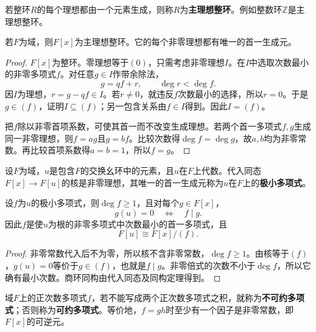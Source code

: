 \begin{definition}
若整环$R$的每个理想都由一个元素生成，则称$R$为\textbf{主理想整环}。例如整数环$\mathbb Z$是主理想整环。
\end{definition}

\begin{theorem}\label{p2:field-poly-pid}
若$F$为域，则$F[x]$为主理想整环。它的每个非零理想都有唯一的首一生成元。
\end{theorem}
\begin{proof}
$F[x]$为整环。零理想等于$(0)$，只需考虑非零理想$I$。在$I$中选取次数最小的非零多项式$f$。对任意$g\in I$作带余除法，
\[
g=qf+r,\qquad\deg r<\deg f.
\]
因$I$为理想，$r=g-qf\in I$。若$r\ne0$，就违反$f$次数最小的选择，所以$r=0$。于是$g\in(f)$，证明$I\subseteq(f)$；另一包含关系由$f\in I$得到。因此$I=(f)$。

把$f$除以非零首项系数，可使其首一而不改变生成理想。若两个首一多项式$f,g$生成同一非零理想，则$f=ag$且$g=bf$。比较次数得$\deg f=\deg g$，故$a,b$均为非零常数。再比较首项系数得$a=b=1$，所以$f=g$。
\end{proof}

\begin{definition}
设$F$为域，$u$是包含$F$的交换幺环中的元素，且$u$在$F$上代数。代入同态$F[x]\to F[u]$的核是非零理想，其唯一的首一生成元称为$u$在$F$上的\textbf{极小多项式}。
\end{definition}

\begin{proposition}
设$f$为$u$的极小多项式，则$\deg f\ge1$，且对每个$g\in F[x]$，
\[
g(u)=0\quad\Longleftrightarrow\quad f\mid g.
\]
因此$f$是使$u$为根的非零多项式中次数最小的首一多项式，且
\[
F[u]\cong F[x]/(f).
\]
\end{proposition}
\begin{proof}
非零常数代入后不为零，所以核不含非零常数，$\deg f\ge1$。由核等于$(f)$，$g(u)=0$等价于$g\in(f)$，也就是$f\mid g$。非零倍式的次数不小于$\deg f$，所以它确有最小次数。商环同构由代入同态及同构定理得到。
\end{proof}

\begin{definition}
域$F$上的正次数多项式$f$，若不能写成两个正次数多项式之积，就称为\textbf{不可约多项式}；否则称为\textbf{可约多项式}。等价地，$f=gh$时至少有一个因子是非零常数，即$F[x]$的可逆元。
\end{definition}

